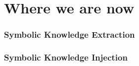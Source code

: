 \documentclass[presentation]{beamer}\mode<presentation>{\usetheme{blackAMSBolognaFC}}
\begin{document}
\section{Where we are now}

\begin{frame}%
\frametitle{Symbolic Knowledge Extraction}



\end{frame}

\begin{frame}%
\frametitle{Symbolic Knowledge Injection}



\end{frame}
\end{document}
